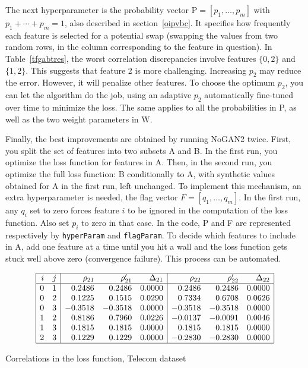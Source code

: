 \documentclass[oneside,10pt]{book}
\renewcommand{\arraystretch}{1.4} %
\begin{document}
The next hyperparameter is the probability vector $\text{P} = [p_1,\dots,p_m]$ with $p_1 + \cdots + p_m =1$, 
 also described in section~\ref{oipvbc}. It specifies how frequently 
 each feature is selected for a potential swap (swapping the values from two random rows, in the column corresponding to the feature in question). 
 In Table~\ref{tfgabtres}, the worst correlation discrepancies involve features $\{0, 2\}$ and $\{1, 2\}$. This suggests that feature 2 is
 more challenging. Increasing $p_2$ may reduce the error. However, it will penalize other features. To choose the optimum $p_2$, you can let the algorithm do the job, using an adaptive $p_2$ automatically fine-tuned over time to minimize the loss. The same applies to all the probabilities in P, as well as the
 two weight parameters in W.

Finally, the best improvements are obtained by running NoGAN2 twice. First, you split the set of features into two subsets A and B. In the first run, 
 you optimize the loss function for features in A. Then, in the second run, you optimize the full loss function: B conditionally to A, with synthetic values obtained for A in the first run, left unchanged. To implement this mechanism, an extra hyperparameter is needed, the flag vector
 $F = [q_1,\dots,q_m]$. In the first run, any $q_i$ set to zero forces feature $i$ to be ignored in the computation of the loss function. Also set $p_i$ to zero in that case. 
 In the code, P and F are represented respectively by \texttt{hyperParam} and \texttt{flagParam}. To decide which features to include in A, add one feature at a time until you hit a wall and the loss function gets stuck well above zero (convergence failure).  This process can be automated. 

\begin{table}[H]
\small
\[
\begin{array}{|rr|rrr|rrr|}
\hline
i	&  j &  \rho_{21} & \rho'_{21}& \Delta_{21} & \rho_{22}& \rho'_{22} & \Delta_{22}\\ 
\hline
0&1&0.2486&0.2486&0.0000&0.2486&0.2486&0.0000\\
0&2&0.1225&0.1515&0.0290&0.7334&0.6708&0.0626\\
0&3&-0.3518&-0.3518&0.0000&-0.3518&-0.3518&0.0000\\
1&2&0.8186&0.7960&0.0226&-0.0137&-0.0091&0.0046\\
1&3&0.1815&0.1815&0.0000&0.1815&0.1815&0.0000\\
2&3&0.1229&0.1229&0.0000&-0.2830&-0.2830&0.0000\\
\hline
\end{array}
\]
\caption{\label{tfgabtres} Correlations in the loss function, Telecom dataset}
\end{table}
\end{document}
